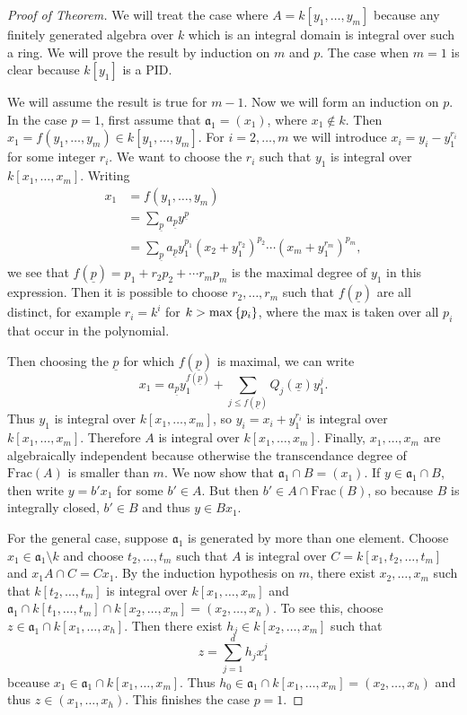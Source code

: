 \documentclass[leqno, openany]{memoir}
\theoremstyle{definition}
\theoremstyle{remark}
\theoremstyle{plain}
\theoremstyle{definition}
\theoremstyle{remark}
\newcommand{\mf}[1]{\mathfrak{#1}}
\newcommand{\mr}[1]{\mathrm{#1}}
\newcommand{\ul}[1]{\underline{#1}}
\begin{document}
\begin{proof}[Proof of Theorem] We will treat the case where $A = k[y_1,
    \ldots, y_m]$ because any finitely generated algebra over $k$ which is an
    integral domain is integral over such a ring. We will prove the result by
    induction on $m$ and $p$. The case when $m = 1$ is clear because $k[y_1]$
    is a PID.

    We will assume the result is true for $m-1$. Now we will form an induction
    on $p$. In the case $p=1$, first assume that $\mf{a}_1 = (x_1)$, where $x_1
    \notin k$. Then $x_1 = f(y_1, \ldots, y_m) \in k[y_1, \ldots, y_m]$. For $i
    = 2, \ldots, m$ we will introduce $x_i = y_i - y_1^{r_i}$ for some integer
    $r_i$. We want to choose the $r_i$ such that $y_1$ is integral over $k[x_1,
    \ldots, x_m]$. Writing \begin{align*} x_1 &= f(y_1, \ldots, y_m) \\ &=
    \sum_{\ul{p}} a_{\ul{p}} y^{\ul{p}} \\ &= \sum_{\ul{p}} a_{\ul{p}}
y_1^{p_1} (x_2 + y_1^{r_2})^{p_2} \cdots (x_m + y_1^{r_m})^{p_m}, \end{align*}
we see that $f(\ul{p}) = p_1 + r_2 p_2 + \cdots r_m p_m$ is the maximal degree
of $y_1$ in this expression. Then it is possible to choose $r_2, \ldots, r_m$
such that $f(\ul{p})$ are all distinct, for example $r_i = k^i$ for $k > \max
\qty{p_i}$, where the max is taken over all $p_i$ that occur in the polynomial.

    Then choosing the $\ul{p}$ for which $f(\ul{p})$ is maximal, we can write
    \[ x_1 = a_{\ul{p}} y_1^{f(\ul{p})} + \sum_{j \leq f(\ul{p})} Q_j(\ul{x})
    y_1^j. \] Thus $y_1$ is integral over $k[x_1, \ldots, x_m]$, so $y_i = x_i
    + y_1^{r_i}$ is integral over $k[x_1, \ldots, x_m]$. Therefore $A$ is
    integral over $k[x_1, \ldots, x_m]$. Finally, $x_1, \ldots, x_m$ are
    algebraically independent because otherwise the transcendance degree of
    $\mr{Frac}(A)$ is smaller than $m$. We now show that $\mf{a}_1 \cap B =
    (x_1)$. If $y \in \mf{a}_1 \cap B$, then write $y = b'x_1$ for some $b' \in
    A$. But then $b' \in A \cap \mr{Frac}(B)$, so because $B$ is integrally
    closed, $b' \in B$ and thus $y \in B x_1$.

    For the general case, suppose $\mf{a}_1$ is generated by more than one
    element. Choose $x_1 \in \mf{a}_1 \setminus k$ and choose $t_2, \ldots,
    t_m$ such that $A$ is integral over $C = k[x_1, t_2, \ldots, t_m]$ and $x_1
    A \cap C = C x_1$. By the induction hypothesis on $m$, there exist $x_2,
    \ldots, x_m$ such that $k[t_2, \ldots, t_m]$ is integral over $k[x_1,
    \ldots, x_m]$ and $\mf{a_1} \cap k[t_1, \ldots, t_m] \cap k[x_2, \ldots,
    x_m] = (x_2, \ldots, x_h)$. To see this, choose $z \in \mf{a}_1 \cap k[x_1,
    \ldots, x_h]$. Then there exist $h_j \in k[x_2, \ldots, x_m]$ such that \[
    z = \sum_{j=1}^d h_j x_1^j \] bceause $x_1 \in \mf{a}_1 \cap k[x_1, \ldots,
    x_m]$. Thus $h_0 \in \mf{a}_1 \cap k[x_1, \ldots, x_m] = (x_2, \ldots,
    x_h)$ and thus $z \in (x_1, \ldots, x_h)$. This finishes the case $p = 1$.


\end{proof}
\end{document}
